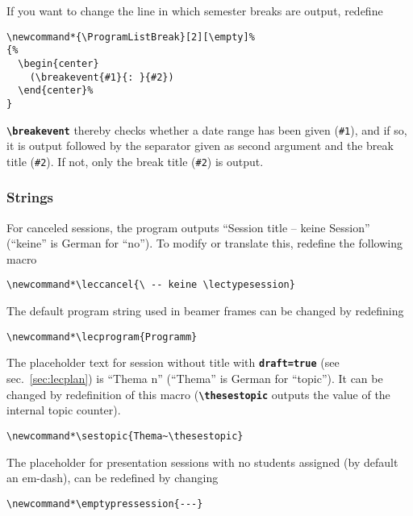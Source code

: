 \documentclass[english]{article}
\newcommand*\jmacro[1]{\textbf{\texttt{#1}}}
\newcommand*\jcsmacro[1]{\jmacro{\textbackslash{#1}}}
\newcommand*\joption[1]{\textbf{\texttt{#1}}}
\newcommand*\jparam[1]{\angus #1\angud}
\begin{document}
%
If you want to change the line in which semester breaks are output, redefine
\begin{lstlisting}[language={[LaTeX]TeX},basicstyle={\small\ttfamily},frame=single,
frame=single,moretexcs={[1]{breakevent}}]
\newcommand*{\ProgramListBreak}[2][\empty]%
{%
  \begin{center}
    (\breakevent{#1}{: }{#2})
  \end{center}%
}
\end{lstlisting}
%
\jcsmacro{breakevent} thereby checks whether a date range has been given (\texttt{\#1}),
and if so, it is output followed by the separator given as second argument and the break
title (\texttt{\#2}). If not, only the break title (\texttt{\#2}) is output.

\subsubsection{Strings}

For canceled sessions, the program outputs
``\jparam{Session title} -- keine \jparam{Session}'' (``keine''
is German for ``no''). To modify or translate this, redefine the
following macro
\begin{lstlisting}[language={[LaTeX]TeX},basicstyle={\small\ttfamily},frame=single,
                   moretexcs={[2]{leccancel,lectypesession}}]
\newcommand*\leccancel{\ -- keine \lectypesession}
\end{lstlisting}
The default program string used in beamer frames can be changed by
redefining
\begin{lstlisting}[language={[LaTeX]TeX},basicstyle={\small\ttfamily},frame=single,
                             moretexcs={[1]{lecprogram}}]
\newcommand*\lecprogram{Programm}
\end{lstlisting}
The placeholder text for session without title with \joption{draft=true}
(see sec.~\ref{sec:lecplan}) is ``Thema \jparam{n}'' (``Thema'' is German for ``topic'').
It can be changed by redefinition of this macro (\jcsmacro{thesestopic} outputs
the value of the internal topic counter).
\begin{lstlisting}[language={[LaTeX]TeX},basicstyle={\small\ttfamily},frame=single,
                   moretexcs={[2]{sestopic,thesestopic}}]
\newcommand*\sestopic{Thema~\thesestopic}
\end{lstlisting}
%
The placeholder for presentation sessions with no students assigned (by default
an em-dash), can be redefined by changing
\begin{lstlisting}[language={[LaTeX]TeX},basicstyle={\small\ttfamily},frame=single,
moretexcs={[1]{emptypressession}}]
\newcommand*\emptypressession{---}
\end{lstlisting}
\end{document}
